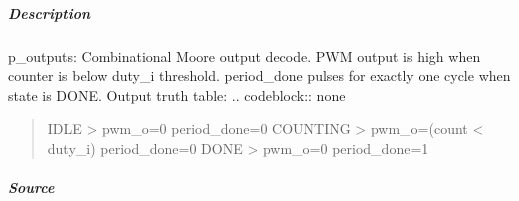 \documentclass[letterpaper,10pt,english]{sphinxmanual}
\begin{document}
\subparagraph{Description}
\label{\detokenize{modules/pwm_controller/processes/p_outputs:description}}
\sphinxAtStartPar
p\_outputs: Combinational Moore output decode.
PWM output is high when counter is below duty\_i threshold.
period\_done pulses for exactly one cycle when state is DONE.
Output truth table:
.. code\sphinxhyphen{}block:: none
\begin{quote}

\sphinxAtStartPar
IDLE     \sphinxhyphen{}\textgreater{} pwm\_o=0 period\_done=0
COUNTING \sphinxhyphen{}\textgreater{} pwm\_o=(count \textless{} duty\_i) period\_done=0
DONE     \sphinxhyphen{}\textgreater{} pwm\_o=0 period\_done=1
\end{quote}

\noindent{}


\subparagraph{Source}
\label{\detokenize{modules/pwm_controller/processes/p_outputs:source}}
\begin{sphinxVerbatim}[commandchars=\\\{\}]
\end{sphinxVerbatim}
\end{document}
